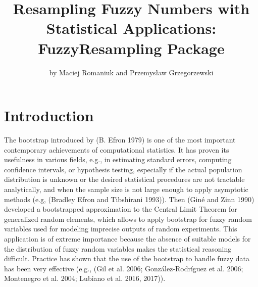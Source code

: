\title{Resampling Fuzzy Numbers with Statistical Applications: FuzzyResampling Package}


\author{by Maciej Romaniuk and Przemysław Grzegorzewski}

\maketitle


\hypertarget{introduction}{%
\section{Introduction}\label{introduction}}

The bootstrap introduced by (B. Efron 1979) is one of the most important
contemporary achievements of computational statistics. It has proven its
usefulness in various fields, e.g., in estimating standard errors,
computing confidence intervals, or hypothesis testing, especially if the
actual population distribution is unknown or the desired statistical
procedures are not tractable analytically, and when the sample size is
not large enough to apply asymptotic methods (e.g, (Bradley Efron and Tibshirani 1993)). Then
(Giné and Zinn 1990) developed a bootstrapped approximation to the Central Limit
Theorem for generalized random elements, which allows to apply bootstrap
for fuzzy random variables used for modeling imprecise outputs of random
experiments. This application is of extreme importance because the
absence of suitable models for the distribution of fuzzy random
variables makes the statistical reasoning difficult. Practice has shown
that the use of the bootstrap to handle fuzzy data has been very
effective (e.g.,
(Gil et al. 2006; González-Rodríguez et al. 2006; Montenegro et al. 2004; Lubiano et al. 2016, 2017)).

